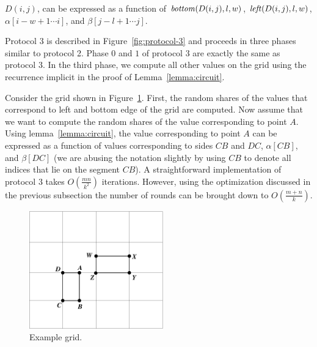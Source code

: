 \begin{lemma}
\rm
\label{lemma:circuit}
$D(i,j)$, can be expressed as a function of ${\it bottom}(D(i,j),l,w)$,
${\it left}(D(i,j),l,w)$, $ \alpha [ i-w+1 \cdots  i ]$, and $\beta [ j-l+1 \cdots j]$.
\end{lemma}



Protocol 3 is described in Figure~\ref{fig:protocol-3} and proceeds in
three phases similar to protocol 2.  Phase $0$ and $1$ of protocol 3 are
exactly the same as protocol 3. In the third phase, we compute all other
values on the grid using the recurrence implicit in the proof of
Lemma~\ref{lemma:circuit}.

Consider the grid shown in Figure~\ref{fig:grid}.  First, the random
shares of the values that correspond to left and bottom edge of the grid
are computed.  Now assume that we want to compute the random shares of
the value corresponding to point $A$. Using lemma~\ref{lemma:circuit},
the value corresponding to point $A$ can be expressed as a function of
values corresponding to sides $CB$ and $DC$, $\alpha [CB]$, and $\beta
[DC]$ (we are abusing the notation slightly by using $CB$ to denote all
indices that lie on the segment $CB$). A straightforward implementation
of protocol $3$ takes $O( \frac{mn}{k^2})$ iterations. However, using
the optimization discussed in the previous subsection the number of
rounds can be brought down to $O(\frac{m+n}{k})$.



\begin{figure}
\centering
    \includegraphics[height=2.0in]{genomics/grid.pdf}
\caption{Example grid.}
\label{fig:grid}
\end{figure}

